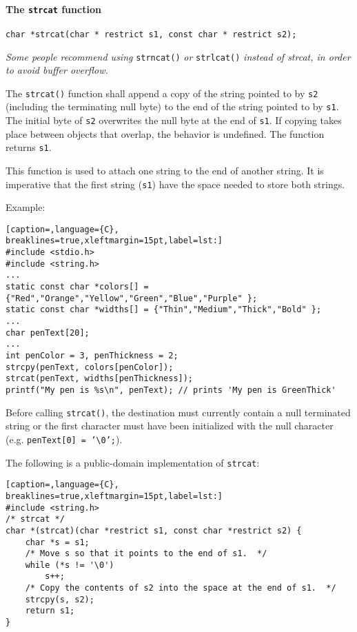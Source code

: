 \paragraph{The \texttt{strcat} function}
\texttt{char *strcat(char * restrict s1, const char * restrict s2);}

\emph{Some people recommend using} \texttt{strncat()} \emph{or}
\texttt{strlcat()} \emph{instead of strcat, in order to avoid buffer overflow.}

The \texttt{strcat()} function shall append a copy of the string pointed to by
\texttt{s2} (including the terminating null byte) to the end of the string
pointed to by \texttt{s1}. The initial byte of \texttt{s2} overwrites the null
byte at the end of \texttt{s1}. If copying takes place between objects that
overlap, the behavior is undefined. The function returns \texttt{s1}.

This function is used to attach one string to the end of another string. It is
imperative that the first string (\texttt{s1}) have the space needed to store
both strings.

Example:
\lstset{basicstyle=\scriptsize, numbers=left, captionpos=b, tabsize=4}
\begin{lstlisting}[caption=,language={C},
breaklines=true,xleftmargin=15pt,label=lst:]
#include <stdio.h>
#include <string.h>
...
static const char *colors[] = {"Red","Orange","Yellow","Green","Blue","Purple" };
static const char *widths[] = {"Thin","Medium","Thick","Bold" };
...
char penText[20];
...
int penColor = 3, penThickness = 2;
strcpy(penText, colors[penColor]);
strcat(penText, widths[penThickness]);
printf("My pen is %s\n", penText); // prints 'My pen is GreenThick'
\end{lstlisting}

Before calling \texttt{strcat()}, the destination must currently contain a null
terminated string or the first character must have been initialized with the
null character (e.g. \texttt{penText[0] = '\textbackslash{}0';}).

The following is a public-domain implementation of \texttt{strcat}:
\lstset{basicstyle=\scriptsize, numbers=left, captionpos=b, tabsize=4}
\begin{lstlisting}[caption=,language={C},
breaklines=true,xleftmargin=15pt,label=lst:]
#include <string.h>
/* strcat */
char *(strcat)(char *restrict s1, const char *restrict s2) {
	char *s = s1;
	/* Move s so that it points to the end of s1.  */
	while (*s != '\0')
	    s++;
	/* Copy the contents of s2 into the space at the end of s1.  */
	strcpy(s, s2);
	return s1;
}
\end{lstlisting}

